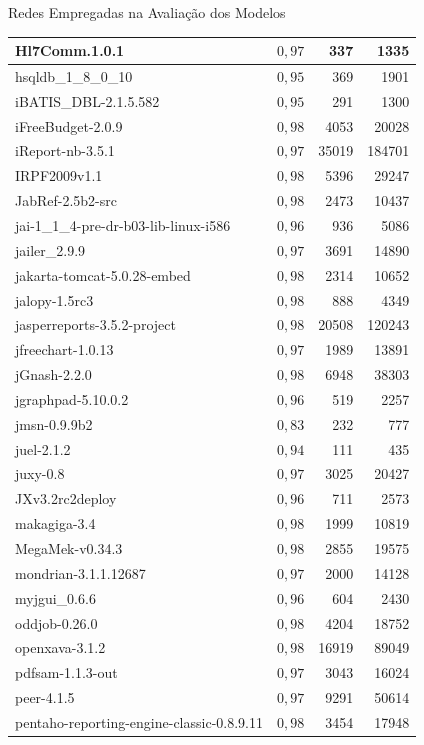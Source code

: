 \begin{chapter}{Redes Empregadas na Avaliação dos Modelos}
\begin{center}
\begin{longtable}{| p{10cm} | c | r | r |}
	Hl7Comm.1.0.1 &  $0,97$ & 337 & 1335 \\ \hline
	hsqldb\_1\_8\_0\_10 &  $0,95$ & 369 & 1901 \\ \hline
	iBATIS\_DBL-2.1.5.582 &  $0,95$ & 291 & 1300 \\ \hline
	iFreeBudget-2.0.9 &  $0,98$ & 4053 & 20028 \\ \hline
	iReport-nb-3.5.1 &  $0,97$ & 35019 & 184701 \\ \hline
	IRPF2009v1.1 &  $0,98$ & 5396 & 29247 \\ \hline
	JabRef-2.5b2-src &  $0,98$ & 2473 & 10437 \\ \hline
	jai-1\_1\_4-pre-dr-b03-lib-linux-i586 &  $0,96$ & 936 & 5086 \\ \hline
	jailer\_2.9.9 &  $0,97$ & 3691 & 14890 \\ \hline
	jakarta-tomcat-5.0.28-embed &  $0,98$ & 2314 & 10652 \\ \hline
	jalopy-1.5rc3 &  $0,98$ & 888 & 4349 \\ \hline
	jasperreports-3.5.2-project &  $0,98$ & 20508 & 120243 \\ \hline
	jfreechart-1.0.13 &  $0,97$ & 1989 & 13891 \\ \hline
	jGnash-2.2.0 &  $0,98$ & 6948 & 38303 \\ \hline
	jgraphpad-5.10.0.2 &  $0,96$ & 519 & 2257 \\ \hline
	jmsn-0.9.9b2 &  $0,83$ & 232 & 777 \\ \hline
	juel-2.1.2 &  $0,94$ & 111 & 435 \\ \hline
	juxy-0.8 &  $0,97$ & 3025 & 20427 \\ \hline
	JXv3.2rc2deploy &  $0,96$ & 711 & 2573 \\ \hline
	makagiga-3.4 &  $0,98$ & 1999 & 10819 \\ \hline
	MegaMek-v0.34.3 &  $0,98$ & 2855 & 19575 \\ \hline
	mondrian-3.1.1.12687 &  $0,97$ & 2000 & 14128 \\ \hline
	myjgui\_0.6.6 &  $0,96$ & 604 & 2430 \\ \hline
	oddjob-0.26.0 &  $0,98$ & 4204 & 18752 \\ \hline
	openxava-3.1.2 &  $0,98$ & 16919 & 89049 \\ \hline
	pdfsam-1.1.3-out &  $0,97$ & 3043 & 16024 \\ \hline
	peer-4.1.5 &  $0,97$ & 9291 & 50614 \\ \hline
	pentaho-reporting-engine-classic-0.8.9.11 &  $0,98$ & 3454 & 17948 \\ \hline

\end{longtable}
\end{center}
\end{chapter}
